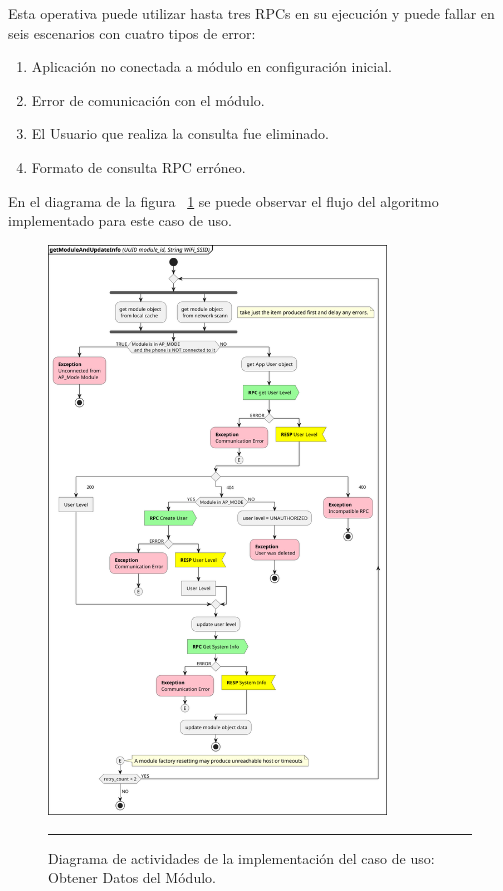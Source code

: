 Esta operativa puede utilizar hasta tres RPCs en su ejecución y puede fallar en seis escenarios con cuatro tipos de error:

\begin{enumerate}
	\item Aplicación no conectada a módulo en configuración inicial.
	\item Error de comunicación con el módulo.
	\item El Usuario que realiza la consulta fue eliminado.
	\item Formato de consulta RPC erróneo.
\end{enumerate}

En el diagrama de la figura ~\ref{fig:act_get_umod_data} se puede observar el flujo del algoritmo implementado para este caso de uso.

\begin{figure}[htbp]
	\centering
	\includegraphics[width=0.8\textwidth]{Figures/iter1/ACT_getModuleAndUpdateInfo_ink.png}
	\rule{35em}{1pt}
	\caption[Actividades Obtener y Actualizar Objeto Módulo]{Diagrama de actividades de la implementación del caso de uso: Obtener Datos del Módulo.}
	\label{fig:act_get_umod_data}
\end{figure}


